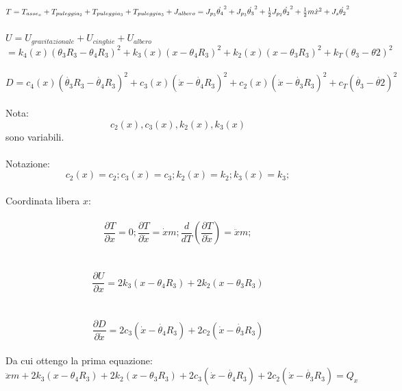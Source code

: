 \documentclass{article}
\begin{document}
$T = T_{asse_x} + T_{puleggia_2}+ T_{puleggia_3} + T_{puleggia_3} + J_{albero}
=  J_{p_3}\dot{\theta_{4}}^{2}  + J_{p_3}\dot{\theta_{3}}^{2}+ \frac{1}{2}J_{p_2}\dot{\theta_{2}}^{2}+ {1 \over 2}m\dot{x}^{2} +J_{s}\dot{\theta_{2}}^{2} $
\\
\\
$U = U_{gravitazionale} + U_{cinghie} + U_{albero} $
\\
$ = k_{4}(x)(\theta_{3}R_{3}-\theta_{4}R_{3})^{2} +k_{3}(x)(x-\theta_{4}R_{3})^{2}+k_{2}(x)(x-\theta_{3}R_{3})^{2}+ k_{T}(\theta_{3}-\theta{2})^{2}$
\\
\\
$D  = c_{4}(x)(\dot{\theta_{3}}R_{3}-\dot{\theta_{4}}R_{3})^{2} +c_{3}(x)(\dot{x}-\dot{\theta_{4}}R_{3})^{2}+c_{2}(x)(\dot{x}-\dot{\theta_{3}}R_{3})^{2}+ c_{T}(\dot{\theta_{3}}-\dot{\theta{2}})^{2}$
\\
\\
Nota: 
$$c_{2}(x), c_{3}(x),k_{2}(x), k_{3}(x)$$ sono variabili.
\\
\\
Notazione:
\begin{equation*}
c_{2}(x) = c_{2};
c_{3}(x) = c_{3};
k_{2}(x) = k_{2};
k_{3}(x) = k_{3};
\end{equation*}
\\
Coordinata libera $x$:
\\
\\
\begin{equation*}
\frac{ \partial T}{\partial x} = 0 ; \frac{\partial T}{\partial \dot{x}} = \dot{x}m;  \frac{d}{dT}(\frac{\partial T}{\partial \dot{x}})  = \ddot{x}m;
\end{equation*}
\\
\\
\begin{equation*}
\frac{\partial U}{\partial x} = 2k_3(x-\theta_4R_3) + 2k_2(x -\theta_3R_3)
\end{equation*}
\\
\\
\begin{equation*}
\frac{\partial D}{\partial \dot{x}} = 2c_3(\dot{x}-\dot{\theta_4}R_3) + 2c_2(\dot{x} -\dot{\theta_3}R_3)
\end{equation*}
\\
Da cui ottengo la prima equazione: 
\\
\begin{equation*}
 \ddot{x}m + 2k_{3}(x-\theta_{4}R_{3}) + 2k_{2}(x- \theta_{3}R_{3})+ 2c_{3}(\dot{x}-\dot{\theta_4}R_{3}) + 2c_{2}(\dot{x} - \dot{\theta_{3}}R_{3}) = Q_x
\end{equation*}
\end{document}

